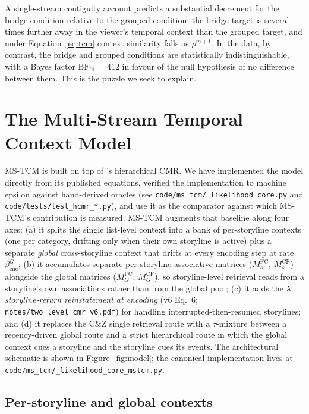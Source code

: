 \documentclass[10pt]{article}
\newcommand{\MCFG}{M^{\mathrm{CF}}_{G}}
\newcommand{\MCFs}{M^{\mathrm{CF}}_{s}}
\newcommand{\MFCG}{M^{\mathrm{FC}}_{G}}
\newcommand{\MFCs}{M^{\mathrm{FC}}_{s}}
\newcommand{\betaencG}{\beta_{\mathrm{enc}}^{G}}
\newcommand{\tauinit}{\tau}
\begin{document}
A single-stream contiguity account predicts a substantial decrement
for the bridge condition relative to the grouped condition: the
bridge target is several times further away in the viewer's temporal
context than the grouped target, and under Equation~\ref{eq:tcm}
context similarity falls as $\rho^{m+1}$. In the data, by contrast,
the bridge and grouped conditions are statistically indistinguishable,
with a Bayes factor $\mathrm{BF}_{01}=412$ in favour of the null
hypothesis of no difference between them. This is the puzzle we seek
to explain.

\section{The Multi-Stream Temporal Context Model}
\label{sec:model}

MS-TCM is built on top of \citet{CornellZhang2025}'s hierarchical CMR.
We have implemented the \citet{CornellZhang2025} model directly from its
published equations, verified the implementation to machine epsilon
against hand-derived oracles (see
\texttt{code/ms\_tcm/\_likelihood\_core.py} and
\texttt{code/tests/test\_hcmr\_*.py}), and use it as the comparator
against which MS-TCM's contribution is measured. MS-TCM augments that
baseline along four axes: (a) it splits the single list-level context
into a bank of per-storyline contexts (one per category, drifting only
when their own storyline is active) plus a separate \emph{global}
cross-storyline context that drifts at every encoding step at rate
$\betaencG$; (b) it accumulates separate per-storyline associative
matrices ($\MFCs$, $\MCFs$) alongside the global matrices ($\MFCG$,
$\MCFG$), so storyline-level retrieval reads from a storyline's own
associations rather than from the global pool; (c) it adds the
$\lambda$ \emph{storyline-return reinstatement at encoding} (v6
Eq.~6; \texttt{notes/two\_level\_cmr\_v6.pdf}) for handling
interrupted-then-resumed storylines; and (d) it replaces the C\&Z
single retrieval route with a $\tauinit$-mixture between a
recency-driven global route and a strict hierarchical route in which
the global context cues a storyline and the storyline cues its
events. The architectural schematic is shown in
Figure~\ref{fig:model}; the canonical implementation lives at
\texttt{code/ms\_tcm/\_likelihood\_core\_mstcm.py}.

\subsection{Per-storyline and global contexts}
\label{sec:hierarchy}
\end{document}

